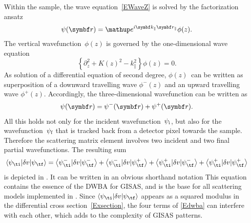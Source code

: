 Within the sample, the wave equation~\cref{EWaveZ}
is solved by the factorization ansatz
\begin{equation}\label{Ekpar}
\psi(\r) = \e^{i \k_\parallel\r_\parallel} \phi(z).
\end{equation}
%
The vertical wavefunction~$\phi(z)$
is governed by the one-dimensional wave equation
\begin{equation}\label{Ewavez}
\left\{\partial_z^2 + K(z)^2 - k_\parallel^2 \right\} \phi(z) = 0.
\end{equation}
As solution of a differential equation of second degree,
$\phi(z)$~can be written as superposition
of a downward travelling wave $\phi^-(z)$
and an upward travelling wave $\phi^+(z)$.
Accordingly, the three-dimensional wavefunction can be written as
\begin{equation}\label{Epsisumpm}
  \psi(\r) = \psi^-(\r)+\psi^+(\r).
\end{equation}
%
%
All this holds not only for the incident wavefunction~$\psi_\si$,
but also for the wavefunction~$\psi_\sf$
that is tracked back from a detector pixel towards the sample.
%
%
%
Therefore the scattering matrix element
involves two incident and two final partial wavefunctions.
The resulting sum
\begin{equation}\label{Edwba4}
  \bra \psi_\ti|\delta v|\psi_\tf\ket
  = \bra \psi^-_\ti|\delta v|\psi^-_\tf\ket
  + \bra \psi^-_\ti|\delta v|\psi^+_\tf\ket
  + \bra \psi^+_\ti|\delta v|\psi^-_\tf\ket
  + \bra \psi^+_\ti|\delta v|\psi^+_\tf\ket
\end{equation}
is depicted in .
It can be written in an obvious shorthand notation
This equation contains the essence of
the DWBA for GISAS,
and is the base for all scattering models implemented in \BornAgain.
Since $\bra \psi_\ti|\delta v|\psi_\tf\ket$
appears as a squared modulus
in the differential cross section~\cref{Exsection},
the four terms of \cref{Edwba} can interfere with each other,
which adds to the complexity of GISAS patterns.

